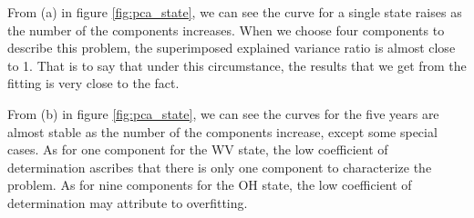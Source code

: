\documentclass{mcmthesis}
\begin{document}
From (a) in figure \ref{fig:pca_state}, we can see the curve for a single state raises as the number of the components increases. When we choose four components to describe this problem, the superimposed explained variance ratio is almost close to 1. That is to say that under this circumstance, the results that we get from the fitting is very close to the fact. 

From (b) in figure \ref{fig:pca_state}, we can see the curves for the five years are almost stable as the number of the components increase, except some special cases. As for one component for the WV state, the low coefficient of determination ascribes that there is only one component to characterize the problem. As for nine components for the OH state, the low coefficient of determination may attribute to overfitting. 

~\smallskip
\end{document}
